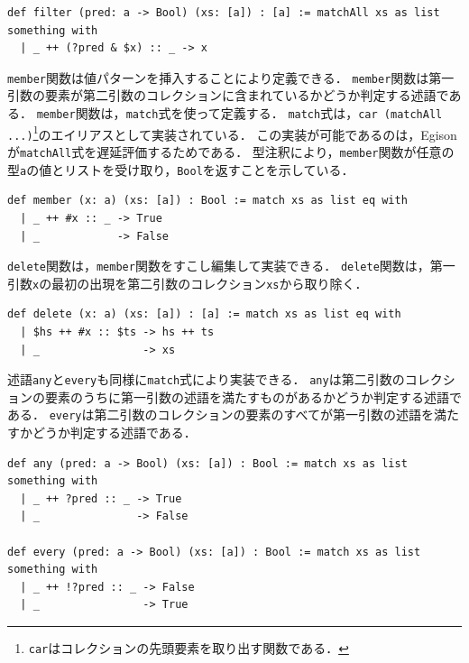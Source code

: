 \begin{lstlisting}[language=egison,numbers=none]
def filter (pred: a -> Bool) (xs: [a]) : [a] := matchAll xs as list something with
  | _ ++ (?pred & $x) :: _ -> x
\end{lstlisting}

\lstinline{member}関数は値パターンを挿入することにより定義できる．
\lstinline{member}関数は第一引数の要素が第二引数のコレクションに含まれているかどうか判定する述語である．
\lstinline{member}関数は，\lstinline{match}式を使って定義する．
\lstinline{match}式は，\lstinline{car (matchAll ...)}\footnote{\lstinline{car}はコレクションの先頭要素を取り出す関数である．}のエイリアスとして実装されている．
この実装が可能であるのは，Egisonが\lstinline{matchAll}式を遅延評価するためである．
型注釈により，\lstinline{member}関数が任意の型\lstinline{a}の値とリストを受け取り，\lstinline{Bool}を返すことを示している．

{\footnotesize
\begin{lstlisting}[language=egison,numbers=none]
def member (x: a) (xs: [a]) : Bool := match xs as list eq with
  | _ ++ #x :: _ -> True
  | _            -> False
\end{lstlisting}
}

\lstinline{delete}関数は，\lstinline{member}関数をすこし編集して実装できる．
\lstinline{delete}関数は，第一引数\lstinline{x}の最初の出現を第二引数のコレクション\lstinline{xs}から取り除く．

{\footnotesize
\begin{lstlisting}[language=egison,numbers=none]
def delete (x: a) (xs: [a]) : [a] := match xs as list eq with
  | $hs ++ #x :: $ts -> hs ++ ts
  | _                -> xs
\end{lstlisting}
}

述語\lstinline{any}と\lstinline{every}も同様に\lstinline{match}式により実装できる．
\lstinline{any}は第二引数のコレクションの要素のうちに第一引数の述語を満たすものがあるかどうか判定する述語である．
\lstinline{every}は第二引数のコレクションの要素のすべてが第一引数の述語を満たすかどうか判定する述語である．

\begin{lstlisting}[language=egison,numbers=none]
def any (pred: a -> Bool) (xs: [a]) : Bool := match xs as list something with
  | _ ++ ?pred :: _ -> True
  | _               -> False

def every (pred: a -> Bool) (xs: [a]) : Bool := match xs as list something with
  | _ ++ !?pred :: _ -> False
  | _                -> True
\end{lstlisting}

